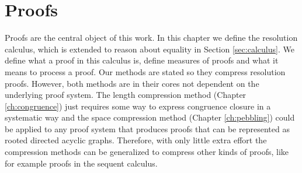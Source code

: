 \chapter*{Proofs}

Proofs are the central object of this work.
In this chapter we define the resolution calculus, which is extended to reason about equality in Section \ref{sec:calculus}.
We define what a proof in this calculus is, define measures of proofs and what it means to process a proof.
Our methods are stated so they compress resolution proofs.
However, both methods are in their cores not dependent on the underlying proof system.
The length compression method (Chapter \ref{ch:congruence}) just requires some way to express congruence closure in a systematic way and the space compression method (Chapter \ref{ch:pebbling}) could be applied to any proof system that produces proofs that can be represented as rooted directed acyclic graphs.
Therefore, with only little extra effort the compression methods can be generalized to compress other kinds of proofs, like for example proofs in the sequent calculus.



%

%



